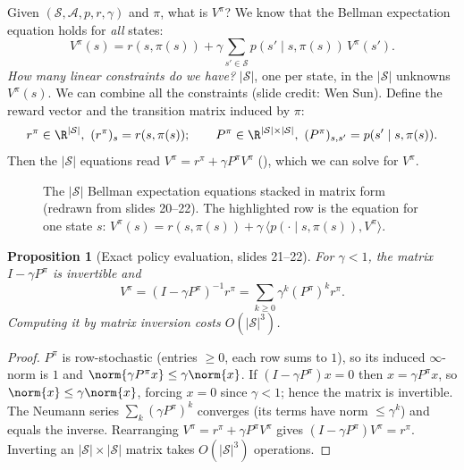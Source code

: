 \documentclass[11pt,a4paper]{article}
\newcommand{\cS}{\mathcal{S}}
\newcommand{\cA}{\mathcal{A}}
\theoremstyle{plain}
\newtheorem{proposition}[theorem]{Proposition}
\theoremstyle{definition}
\theoremstyle{remark}
\begin{document}
Given $(\cS,\cA,p,r,\gamma)$ and $\pi$, what is $V^\pi$? We know that the Bellman expectation equation holds for \emph{all} states:
\[
V^\pi(s)=r(s,\pi(s))+\gamma\sum_{s'\in\cS}p(s'\mid s,\pi(s))\,V^\pi(s').
\]
\emph{How many linear constraints do we have?} $|\cS|$, one per state, in the $|\cS|$ unknowns $V^\pi(s)$. We can combine all the constraints (slide credit: Wen Sun). Define the reward vector and the transition matrix induced by $\pi$:
\[
r^\pi\in\R^{|\cS|},\ (r^\pi)_s=r(s,\pi(s));\qquad
P^\pi\in\R^{|\cS|\times|\cS|},\ (P^\pi)_{s,s'}=p(s'\mid s,\pi(s)).
\]
Then the $|\cS|$ equations read $V^\pi=r^\pi+\gamma P^\pi V^\pi$ (), which we can solve for $V^\pi$.

\begin{figure}[htbp]
\centering
{}
\caption{The $|\cS|$ Bellman expectation equations stacked in matrix form (redrawn from slides 20--22). The highlighted row is the equation for one state $s$: $V^\pi(s)=r(s,\pi(s))+\gamma\,\langle p(\cdot\mid s,\pi(s)),V^\pi\rangle$.}
\label{fig:matrix}
\end{figure}

\begin{proposition}[Exact policy evaluation, slides 21--22]\label{prop:exact}
For $\gamma<1$, the matrix $I-\gamma P^\pi$ is invertible and
\[
V^\pi=(I-\gamma P^\pi)^{-1}r^\pi=\sum_{k\ge0}\gamma^k(P^\pi)^kr^\pi .
\]
Computing it by matrix inversion costs $O(|\cS|^3)$.
\end{proposition}
\begin{proof}
$P^\pi$ is row-stochastic (entries $\ge0$, each row sums to $1$), so its induced $\infty$-norm is $1$ and $\norm{\gamma P^\pi x}\le\gamma\norm{x}$. If $(I-\gamma P^\pi)x=0$ then $x=\gamma P^\pi x$, so $\norm{x}\le\gamma\norm{x}$, forcing $x=0$ since $\gamma<1$; hence the matrix is invertible. The Neumann series $\sum_k(\gamma P^\pi)^k$ converges (its terms have norm $\le\gamma^k$) and equals the inverse. Rearranging $V^\pi=r^\pi+\gamma P^\pi V^\pi$ gives $(I-\gamma P^\pi)V^\pi=r^\pi$. Inverting an $|\cS|\times|\cS|$ matrix takes $O(|\cS|^3)$ operations.
\end{proof}
\end{document}
